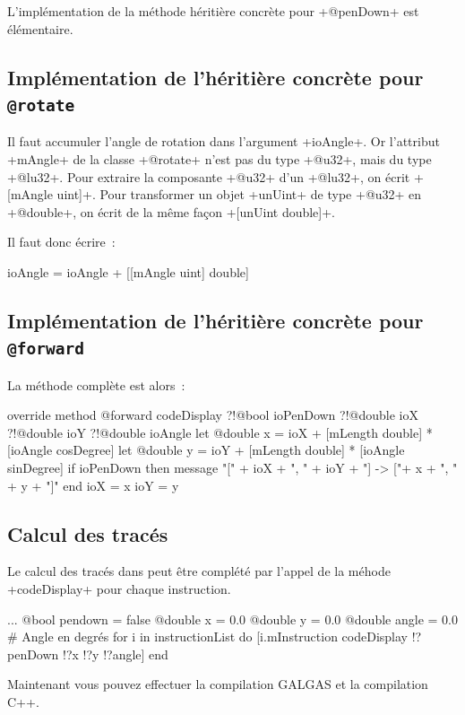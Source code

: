 L'implémentation de la méthode héritière concrète pour \ggsq+@penDown+ est élémentaire.

\subsection{Implémentation de l'héritière concrète pour \texttt{@rotate}}
Il faut accumuler l'angle de rotation dans l'argument \ggsq+ioAngle+. Or l'attribut \ggsq+mAngle+ de la classe \ggsq+@rotate+ n'est pas du type \ggsq+@u32+, mais du type \ggsq+@lu32+. Pour extraire la composante \ggsq+@u32+ d’un \ggsq+@lu32+, on écrit \ggsq+[mAngle uint]+. Pour transformer un objet \ggsq+unUint+ de type \ggsq+@u32+ en \ggsq+@double+, on écrit de la même façon \ggsq+[unUint double]+.


 Il faut donc écrire~:
\begin{galgas4}
ioAngle = ioAngle + [[mAngle uint] double]
\end{galgas4}

\subsection{Implémentation de l'héritière concrète pour \texttt{@forward}}
La méthode complète est alors~:

\begin{galgas4}
override method @forward codeDisplay
  ?!@bool ioPenDown
  ?!@double ioX
  ?!@double ioY
  ?!@double ioAngle
{
  let @double x = ioX + [mLength double] * [ioAngle cosDegree]
  let @double y = ioY + [mLength double] * [ioAngle sinDegree]
  if ioPenDown then
    message "[" + ioX + ", " + ioY + "] -> ["+ x + ", " + y + "]\n"
  end
  ioX = x
  ioY = y
}
\end{galgas4}

\subsection{Calcul des tracés}
Le calcul des tracés dans  peut être complété par l'appel de la méhode \ggsq+codeDisplay+ pour chaque instruction.
\begin{galgas4}
  ...
  @bool pendown = false
  @double x = 0.0
  @double y = 0.0
  @double angle = 0.0 # Angle en degrés
  for i in instructionList do
    [i.mInstruction codeDisplay !?penDown !?x !?y !?angle]
  end
\end{galgas4}

Maintenant vous pouvez effectuer la compilation GALGAS et la compilation C++.

